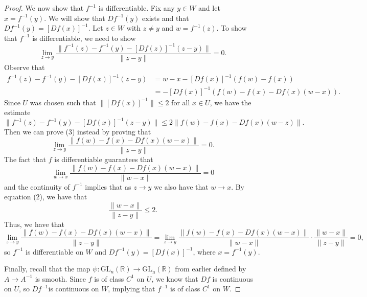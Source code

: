 \documentclass[11pt]{article}
\theoremstyle{definition}
\newcommand{\R}{\mathbb{R}}                      %
\begin{document}
\begin{proof}
    We now show that $f^{-1}$ is differentiable. Fix any $y\in W$ and let $x=f^{-1}(y)$. We will show that $Df^{-1}(y)$ exists and that $Df^{-1}(y)=[Df(x)]^{-1}$. Let $z\in W$ with $z\neq y$ and $w=f^{-1}(z)$. 
    To show that $f^{-1}$ is differentiable, we need to show
    \begin{equation}
        \lim_{z\to y} \frac{\|f^{-1}(z)-f^{-1}(y)-[Df(z)]^{-1}(z-y)\|}{\|z-y\|}=0.
    \end{equation}
    Observe that
    $$
    \begin{aligned}
        f^{-1}(z)-f^{-1}(y)-[Df(x)]^{-1}(z-y)&=w-x-[Df(x)]^{-1}(f(w)-f(x))\\
        &=-[Df(x)]^{-1}(f(w)-f(x)-Df(x)(w-x)).
    \end{aligned}
    $$
    Since $U$ was chosen such that $\|[Df(x)]^{-1}\|\leq 2$ for all $x\in U$, we have the estimate
    $$
    \|f^{-1}(z)-f^{-1}(y)-[Df(x)]^{-1}(z-y)\|\leq 2\|f(w)-f(x)-Df(x)(w-z)\|.
    $$
    Then we can prove (3) instead by proving that 
    $$
    \lim_{z\to y}\frac{\|f(w)-f(x)-Df(x)(w-x)\|}{\|z-y\|}=0.
    $$
    The fact that $f$ is differentiable guarantees that
    $$
    \lim_{w\to x} \frac{\|f(w)-f(x)-Df(x)(w-x)\|}{\|w-x\|}=0
    $$
    and the continuity of $f^{-1}$ implies that as $z\to y$ we also have that $w\to x$.  By equation (2), we have that
    $$
    \frac{\|w-x\|}{\|z-y\|}\leq 2.
    $$
    Thus, we have that
    $$
    \lim_{z\to y} \frac{\|f(w)-f(x)-Df(x)(w-x)\|}{\|z-y\|}=\lim_{z\to y} \frac{\|f(w)-f(x)-Df(x)(w-x)\|}{\|w-x\|}\cdot\frac{\|w-x\|}{\|z-y\|}=0,
    $$
    so $f^{-1}$ is differentiable on $W$ and $Df^{-1}(y)=[Df(x)]^{-1}$, where $x=f^{-1}(y)$.

    Finally, recall that the map $\psi:\mathrm{GL}_n(\R)\to \mathrm{{GL}_n(\R)}$ from earlier defined by $A\to A^{-1}$ is smooth. Since $f$ is of class $C^1$ on $U$, we know that $Df$ is continuous on $U$, so $Df^{-1}$is continuous on $W$, implying that $f^{-1}$ is of class $C^1$ on $W$.
\end{proof}
\end{document}
